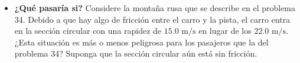 \documentclass[11pt,a4paper]{article}
\begin{document}
\begin{itemize}
    \item[\textbf{47.}] \textbf{¿Qué pasaría si?} Considere la montaña rusa que se describe en el problema 34. Debido a que hay algo de fricción entre el carro y la pista, el carro entra en la sección circular con una rapidez de $15.0 \text{ m/s}$ en lugar de los $22.0 \text{ m/s}$. ¿Esta situación es más o menos peligrosa para los pasajeros que la del problema 34? Suponga que la sección circular aún está sin fricción.
    \vspace*{6cm}
\end{itemize}
\end{document}

